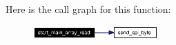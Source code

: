Here is the call graph for this function:\begin{figure}[H]
\begin{center}
\leavevmode
\includegraphics[width=136pt]{external__flash_8c_a1_cgraph}
\end{center}
\end{figure}
